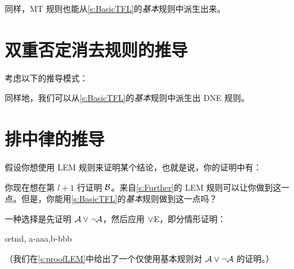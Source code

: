 \begin{fitchproof}
		\open
		\AS
		\close
\end{fitchproof}


同样，MT 规则也能从\cref{s:BasicTFL}的\emph{基本}规则中派生出来。

\section{双重否定消去规则的推导}
考虑以下的推导模式：


\begin{fitchproof}
	\open
		\AS
	\close
\end{fitchproof}


同样地，我们可以从\cref{s:BasicTFL}的\emph{基本}规则中派生出 DNE 规则。

\section{排中律的推导}
假设你想使用 LEM 规则来证明某个结论，也就是说，你的证明中有：


\begin{fitchproof}
  \open
  \AS
  \close
  \open
  \AS
  \close
\end{fitchproof}


你现在想在第 $l+1$ 行证明 $\mathcal{B}$。来自\cref{s:Further}的 LEM 规则可以让你做到这一点。但是，你能用\cref{s:BasicTFL}的\emph{基本}规则做到这一点吗？

一种选择是先证明 $\mathcal{A} \vee \neg\mathcal{A}$，然后应用 $\vee$E，即分情形证明：


\begin{fitchproof}
  \open
  \AS
  \close
  \open
  \AS
  \close
  \ellipsesline
  \oe{tnd, a-aaa,b-bbb}
\end{fitchproof}


（我们在\cref{s:proofLEM}中给出了一个仅使用基本规则对 $\mathcal{A} \vee \neg\mathcal{A}$ 的证明。）

